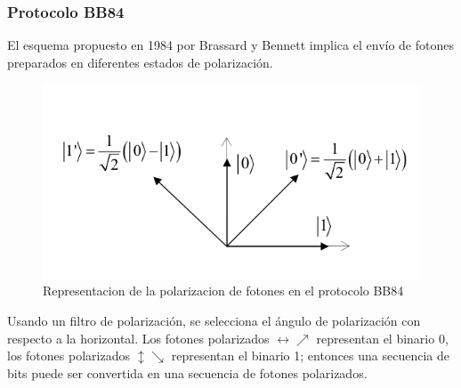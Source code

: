 \documentclass[11pt, conference]{IEEEtran}
\begin{document}
\subsubsection{\bf Protocolo BB84}
El esquema propuesto en 1984 por Brassard y Bennett implica el envío de fotones preparados en diferentes estados de polarización.
\begin{figure}[hbtp]
\centering
\includegraphics[scale=0.4]{1.png} 
\caption{Representacion de la polarizacion de fotones
en el protocolo BB84}
\end{figure}
Usando un filtro de polarización, se selecciona el ángulo de polarización con respecto a la horizontal. Los fotones polarizados $\leftrightarrow \nearrow$ representan el binario 0, los fotones polarizados $\updownarrow \searrow$ representan el binario 1; entonces una secuencia de bits puede ser convertida en una secuencia de fotones polarizados.
\end{document}
